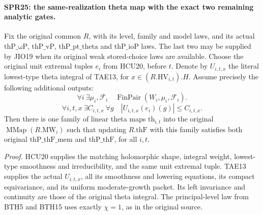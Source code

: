 \paragraph{SPR25: the same-realization theta map with the exact two remaining analytic gates.}
\label{claim:SPR25}
Fix the original common \(R\), with its level, family and model
laws, and its actual \(\mathrm{thP\_\omega P}\),
\(\mathrm{thP\_vP}\), \(\mathrm{thP\_pt\_theta}\) and
\(\mathrm{thP\_ioP}\) laws.  The last two may be supplied by
JIO19 when its original weak stored-choice laws are available.
Choose the original unit extremal tuples \(e_i\) from HCU20,
before \(t\).  Denote by \(U_{i,t,x}\) the literal lowest-type
theta integral of TAE13, for \(x\in(R.\mathrm{HV}_{i,t}).H\).
Assume precisely the following additional outputs:
\[
 \forall i\ \exists\mu_i,\mathcal F_i\quad
       \operatorname{FinPair}(W_i,\mu_i,\mathcal F_i).
 \tag{SPR.51}
\]
\[
 \forall i,t,x\ \exists C_{i,t,x}\ \forall g\quad
       |U_{i,t,x}(e_i)(g)|\le C_{i,t,x}.
 \tag{SPR.52}
\]
Then there is one family of linear theta maps \(\mathrm{th}_{i,t}\)
into the original \(\operatorname{MMap}(R.\mathrm{MW}_i)\)
such that updating \(R.\mathrm{thF}\) with this family satisfies
both original \(\mathrm{thP\_thF\_mem}\) and
\(\mathrm{thP\_thF}\), for all \(i,t\).

\emph{Proof.}
HCU20 supplies the matching holomorphic shape, integral weight,
lowest-type smoothness and irreducibility, and the same unit
extremal tuple.  TAE13 supplies the actual \(U_{i,t,x}\), all
its smoothness and lowering equations, its compact equivariance,
and its uniform moderate-growth packet.  Its left invariance
and continuity are those of the original theta integral.
The principal-level law from BTH5 and BTH15 uses exactly
\(\chi=1\), as in the original source.

